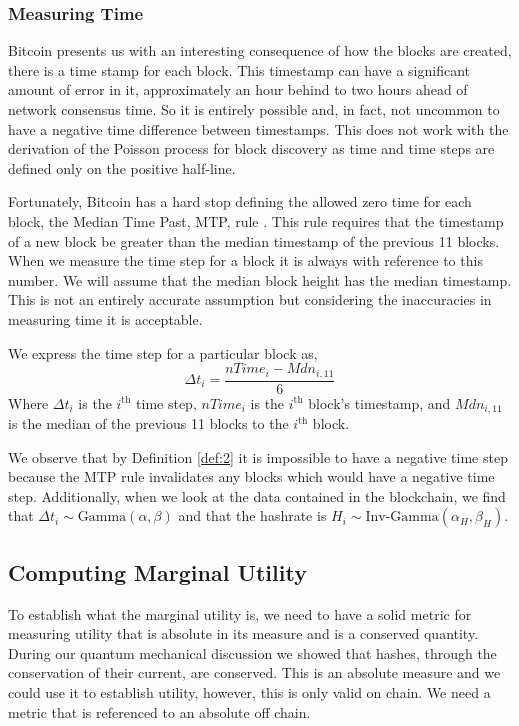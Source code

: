 \documentclass[runningheads]{llncs}
\begin{document}
\subsubsection{Measuring Time}
Bitcoin presents us with an interesting consequence of how the blocks are created, there is a time stamp for each block.
This timestamp can have a significant amount of error in it, approximately an hour behind to two hours ahead of network consensus time.
So it is entirely possible and, in fact, not uncommon to have a negative time difference between timestamps.
This does not work with the derivation of the Poisson process for block discovery as time and time steps are defined only on the positive half-line.

Fortunately, Bitcoin has a hard stop defining the allowed zero time for each block, the Median Time Past, MTP, rule \cite{bitcoin2021core}.
This rule requires that the timestamp of a new block be greater than the median timestamp of the previous 11 blocks.
When we measure the time step for a block it is always with reference to this number.
We will assume that the median block height has the median timestamp.
This is not an entirely accurate assumption but considering the inaccuracies in measuring time it is acceptable.
\begin{definition} \label{def:2}
    We express the time step for a particular block as,
    \begin{equation}
        \Delta t_i = \frac{nTime_i - Mdn_{i,11}}{6}
    \end{equation}
    Where $\Delta t_i$ is the $i^{\mbox{th}}$ time step, $nTime_i$ is the $i^{\mbox{th}}$ block's timestamp, and $Mdn_{i,11}$ is the median of the previous 11 blocks to the $i^{\mbox{th}}$ block.
\end{definition}

We observe that by Definition \ref{def:2} it is impossible to have a negative time step because the MTP rule invalidates any blocks which would have a negative time step.
Additionally, when we look at the data contained in the blockchain, we find that $\Delta t_i \sim \mbox{Gamma}(\alpha, \beta)$ and that the hashrate is $H_i \sim \mbox{Inv-Gamma}(\alpha_H, \beta_H)$.

\subsection{Computing Marginal Utility}
To establish what the marginal utility is, we need to have a solid metric for measuring utility that is absolute in its measure and is a conserved quantity.
During our quantum mechanical discussion we showed that  hashes, through the conservation of their current, are conserved.
This is an absolute measure and we could use it to establish utility, however, this is only valid on chain.
We need a metric that is referenced to an absolute off chain.
\end{document}
